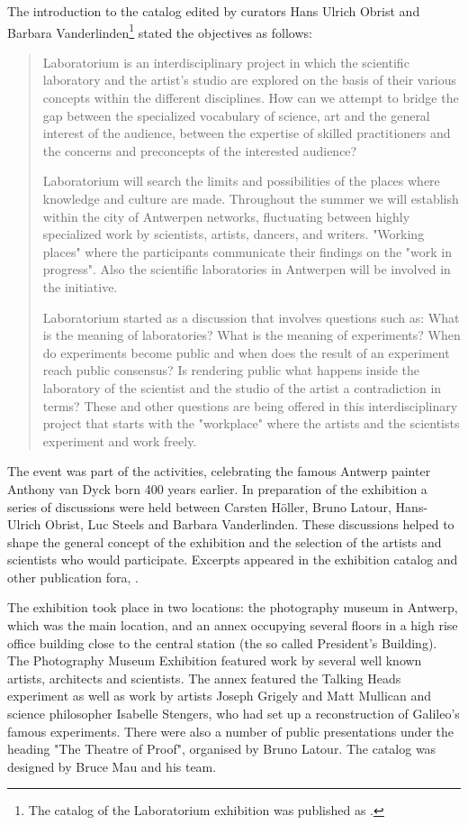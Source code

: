 The introduction to the catalog edited by curators Hans Ulrich Obrist
and Barbara Vanderlinden\footnote{
The catalog of the Laboratorium exhibition was published as 
\cite{Obrist:1999}.} stated the objectives as follows: 
\begin{quotation}
{ Laboratorium is an interdisciplinary project in which the scientific laboratory and the artist's studio are explored
on the basis of their various concepts within the different disciplines. How can we attempt to bridge the gap between 
the specialized vocabulary of science, art and the general interest of the audience, between the expertise of skilled
practitioners and the concerns and preconcepts of the interested audience? 

Laboratorium will search the limits and possibilities of the places where knowledge and culture are made. Throughout 
the summer we will establish within the city of Antwerpen networks, fluctuating between highly specialized work by 
scientists, artists, dancers, and writers. "Working places" where the participants communicate their findings on the 
"work in progress". Also the scientific laboratories in Antwerpen will be involved in the initiative. 

Laboratorium started as a discussion that involves questions such as: What is the meaning of laboratories? What is 
the meaning of experiments? When do experiments become public and when does the result of an experiment reach 
public consensus? Is rendering public what happens inside the laboratory of the scientist and the studio of the 
artist a contradiction in terms? These and other questions are being offered in this interdisciplinary project 
that starts with the "workplace" where the artists and the scientists experiment and work freely.}
\end{quotation}

The event was part of the activities, celebrating the famous Antwerp painter Anthony van Dyck born 400 years earlier.
In preparation of the exhibition a series of discussions were held between  
Carsten H\"{o}ller, Bruno Latour, Hans-Ulrich Obrist, Luc Steels and Barbara Vanderlinden. These discussions helped 
to shape the general concept of the exhibition and the selection of the artists and scientists who would participate. 
Excerpts appeared in the exhibition catalog and other publication fora, \cite{Obrist:2003}. 

The exhibition took place in two locations: the photography museum in Antwerp, which was the main location, and an annex 
occupying several floors in a high rise office building close to the central station (the so called President's
Building). The Photography Museum Exhibition featured work by several well known artists, architects and scientists. 
The annex featured the Talking Heads experiment as well as 
work by artists Joseph Grigely and Matt Mullican and science philosopher 
Isabelle Stengers, who had set up a reconstruction of Galileo's famous experiments. 
There were also a number of public presentations under the heading 
"The Theatre of Proof", organised by Bruno Latour. The catalog was designed by Bruce Mau and his team. 

